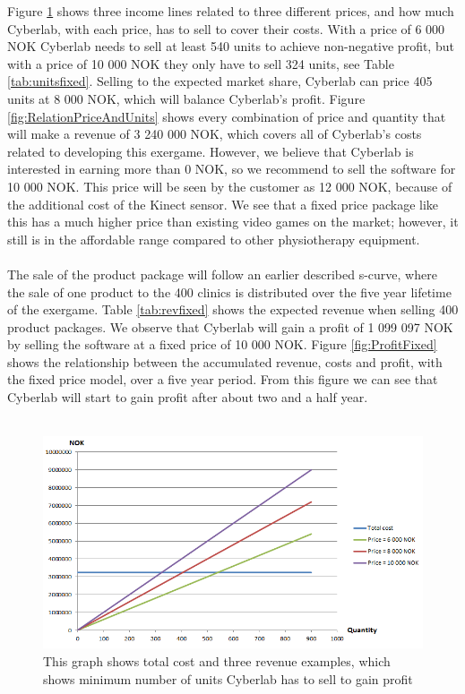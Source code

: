 Figure \ref{fig:RevenueStreamQuantity} shows three income lines related to three different prices, and how much Cyberlab, with each price, has to sell to cover their costs. With a price of 6 000 NOK Cyberlab needs to sell at least 540 units to achieve non-negative profit, but with a price of 10 000 NOK they only have to sell 324 units, see Table \ref{tab:unitsfixed}. Selling to the expected market share, Cyberlab can price 405 units at 8 000 NOK, which will balance Cyberlab's profit. Figure \ref{fig:RelationPriceAndUnits} shows every combination of price and quantity that will make a revenue of 3 240 000 NOK, which covers all of Cyberlab's costs related to developing this exergame. However, we believe that Cyberlab is interested in earning more than 0 NOK, so we recommend to sell the software for 10 000 NOK. This price will be seen by the customer as 12 000 NOK, because of the additional cost of the Kinect sensor. We see that a fixed price package like this has a much higher price than existing video games on the market; however, it still is in the affordable range compared to other physiotherapy equipment. \\ \\
The sale of the product package will follow an earlier described s-curve, where the sale of one product to the 400 clinics is distributed over the five year lifetime of the exergame. Table \ref{tab:revfixed} shows the expected revenue when selling 400 product packages. We observe that Cyberlab will gain a profit of 1 099 097 NOK by selling the software at a fixed price of 10 000 NOK. Figure \ref{fig:ProfitFixed} shows the relationship between the accumulated revenue, costs and profit, with the fixed price model, over a five year period. From this figure we can see that Cyberlab will start to gain profit after about two and a half year. \\ \\
\begin{figure}
\begin{center}
\includegraphics[scale=0.7]{revenuestreamquantity}
\caption[Quantity examples]{This graph shows total cost and three revenue examples, which shows minimum number of units Cyberlab has to sell to gain profit}
\label{fig:RevenueStreamQuantity}
\end{center}
\end{figure}

